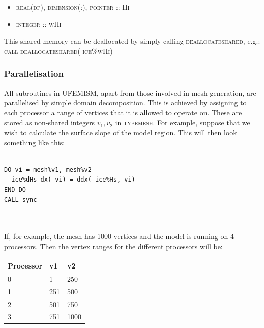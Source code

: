 \documentclass{article}
\begin{document}
\begin{itemize}
\item \textsc{real(dp), dimension(:), pointer :: Hi}
\item \textsc{integer :: wHi}
\end{itemize}

This shared memory can be deallocated by simply calling \textsc{deallocate\textunderscore shared}, e.g.:\\
\textsc{call deallocate\textunderscore shared( ice\%wHi)}

\subsubsection{Parallelisation}

All subroutines in UFEMISM, apart from those involved in mesh generation, are parallelised by simple domain decomposition. This is achieved by assigning to each processor a range of vertices that it is allowed to operate on. These are stored as non-shared integers $v_1,v_2$ in \textsc{type\textunderscore mesh}. For example, suppose that we wish to calculate the surface slope of the model region. This will then look something like this:

\hrulefill
\begin{lstlisting}

DO vi = mesh%v1, mesh%v2
  ice%dHs_dx( vi) = ddx( ice%Hs, vi)
END DO
CALL sync

\end{lstlisting}
\hrulefill
\\
\\

If, for example, the mesh has 1000 vertices and the model is running on 4 processors. Then the vertex ranges for the different processors will be:

\begin{table}[H]
  \begin{center}
    \begin{tabular}{l|l|l}
      \textbf{Processor} & \textbf{v1} & \textbf{v2}\\
      \hline
      0 & 1 & 250 \\
      1 & 251 & 500 \\
      2 & 501 & 750 \\ 
      3 & 751 & 1000 \\
    \end{tabular}
  \end{center}
\end{table}
\end{document}
